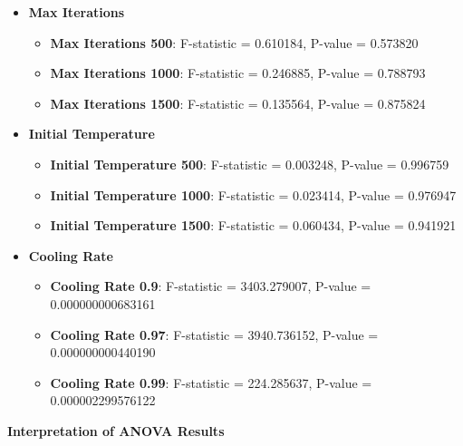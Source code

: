 \documentclass[
]{article}
\begin{document}
    \begin{itemize}
        \item \textbf{Max Iterations}
        \begin{itemize}
            \item \textbf{Max Iterations 500}: F-statistic = 0.610184, P-value = 0.573820
            \item \textbf{Max Iterations 1000}: F-statistic = 0.246885, P-value = 0.788793
            \item \textbf{Max Iterations 1500}: F-statistic = 0.135564, P-value = 0.875824
        \end{itemize}
        \item \textbf{Initial Temperature}
        \begin{itemize}
            \item \textbf{Initial Temperature 500}: F-statistic = 0.003248, P-value = 0.996759
            \item \textbf{Initial Temperature 1000}: F-statistic = 0.023414, P-value = 0.976947
            \item \textbf{Initial Temperature 1500}: F-statistic = 0.060434, P-value = 0.941921
        \end{itemize}
        \item \textbf{Cooling Rate}
        \begin{itemize}
            \item \textbf{Cooling Rate 0.9}: F-statistic = 3403.279007, P-value = 0.000000000683161
            \item \textbf{Cooling Rate 0.97}: F-statistic = 3940.736152, P-value = 0.000000000440190
            \item \textbf{Cooling Rate 0.99}: F-statistic = 224.285637, P-value = 0.000002299576122
        \end{itemize}
    \end{itemize}

    \textbf{Interpretation of ANOVA Results}
\end{document}
